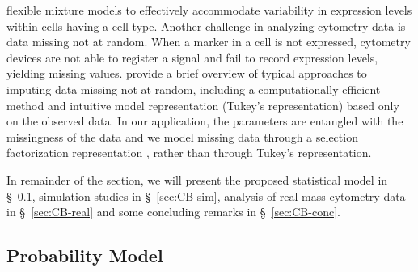 \documentclass[12pt,]{article}
\begin{document}
flexible mixture models to effectively accommodate variability in expression levels within cells having a cell type.  Another challenge in analyzing 
cytometry data is data missing not at random. When a marker in a cell is not expressed, cytometry devices are not
able to register a signal and fail to record expression levels, yielding missing values. \cite{franks2016non}
provide a brief overview of typical approaches to imputing data missing not at
random, including a computationally efficient method and intuitive model
representation (Tukey's representation) based only on the observed data. 
In our application, the parameters are entangled with the missingness of the data and we model missing data through a selection factorization representation \citep{rubin1974characterizing}, rather than through Tukey's representation. 


In remainder of the section, we will present the proposed statistical model in \S~\ref{prob-model}, simulation studies in \S~\ref{sec:CB-sim}, analysis of real mass cytometry data in \S~\ref{sec:CB-real} and some concluding remarks in \S~\ref{sec:CB-conc}.










\subsection{Probability Model}\label{prob-model}
\end{document}

